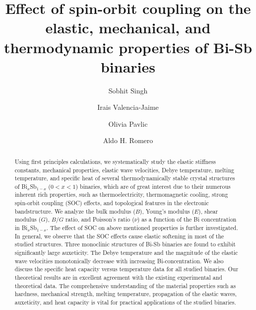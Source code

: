 \documentclass[twocolumn,superscriptaddress,nofootinbib,floatfix,aps,showpacs,prb,citeautoscript,reprint]{revtex4-1}
\begin{document}
\title{Effect of spin-orbit coupling on the elastic, mechanical, and thermodynamic properties of Bi-Sb binaries}


\author{Sobhit Singh } 

\author{Irais Valencia-Jaime}

\author{Olivia Pavlic}

\author{Aldo H. Romero}


\begin{abstract}
Using first principles calculations, we systematically study the elastic stiffness constants, mechanical properties, elastic wave velocities, Debye temperature, melting temperature, and specific heat of several thermodynamically stable crystal structures of Bi$_{x}$Sb$_{1-x}$  ($0 < x < 1$) binaries, which are of great interest due to their numerous inherent rich properties, such as thermoelectricity, thermomagnetic cooling, strong spin-orbit coupling (SOC) effects, and topological features in the electronic bandstructure. We analyze the bulk modulus ($B$), Young's modulus ($E$), shear modulus ($G$), $B/G$ ratio, and Poisson's ratio ($\nu$) as a function of the Bi concentration in Bi$_{x}$Sb$_{1-x}$. The effect of SOC on above mentioned properties is further investigated. In general, we observe that the SOC effects cause elastic softening in most of the studied structures. Three monoclinic structures of Bi-Sb binaries are found to exhibit significantly large auxeticity. The Debye temperature and the magnitude of the elastic wave velocities monotonically decrease with increasing Bi-concentration. We also discuss the specific heat capacity versus temperature data for all studied binaries. Our theoretical results are in excellent agreement with the existing experimental and theoretical data. The comprehensive understanding of the material properties such as hardness, mechanical strength, melting temperature, propagation of the elastic waves, auxeticity, and heat capacity is vital for practical applications of the studied binaries. 
\end{abstract}	
\end{document}
